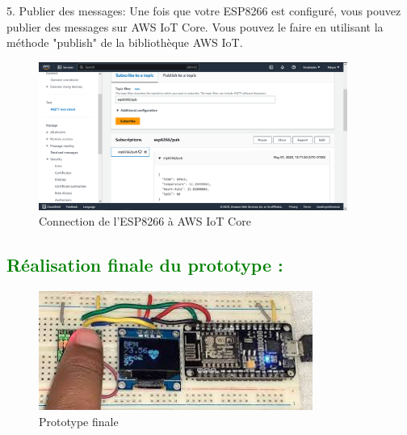 \begin{flushleft}
	5. Publier des messages: Une fois que votre ESP8266 est configuré, vous pouvez publier des messages sur AWS IoT Core. Vous pouvez le faire en utilisant la méthode "publish" de la bibliothèque AWS IoT.
		
		\begin{figure}[h]
			\centering
			\includegraphics[width=0.9\textwidth]{chapitres/images/aws2.PNG}
			\caption{Connection de l'ESP8266 à AWS IoT Core}
			\label{fig:labelname}
		\end{figure}
	
	\newpage
	\subsection{\textcolor{green}{Réalisation finale du prototype :}}
	
			
			\begin{figure}[h]
				\centering
				\includegraphics[width=0.8\textwidth]{chapitres/images/Prototyp2.jpg}
				\caption{Prototype finale}
				\label{fig:labelname}
			\end{figure}
	\newpage
\end{flushleft}